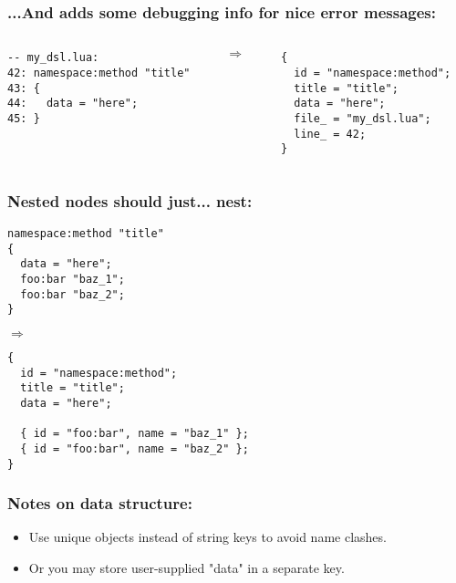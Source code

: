 \documentclass[handout]{beamer}
\begin{document}
\begin{frame}[fragile]

\frametitle{...And adds some debugging info for nice error messages:}

\begin{columns}

\begin{column}{0.5\textwidth}
\begin{verbatim}
-- my_dsl.lua:
42: namespace:method "title"
43: {
44:   data = "here";
45: }
\end{verbatim}
\end{column}

\begin{column}{0.05\textwidth}
$\Rightarrow$
\end{column}

\begin{column}{0.5\textwidth}
\begin{verbatim}
{
  id = "namespace:method";
  title = "title";
  data = "here";
  file_ = "my_dsl.lua";
  line_ = 42;
}
\end{verbatim}
\end{column}

\end{columns}

\end{frame}


\begin{frame}[fragile]

\frametitle{Nested nodes should just... nest:}

\begin{verbatim}
namespace:method "title"
{
  data = "here";
  foo:bar "baz_1";
  foo:bar "baz_2";
}
\end{verbatim}

$\Rightarrow$

\begin{verbatim}
{
  id = "namespace:method";
  title = "title";
  data = "here";

  { id = "foo:bar", name = "baz_1" };
  { id = "foo:bar", name = "baz_2" };
}
\end{verbatim}

\end{frame}


\begin{frame}[fragile]

\frametitle{Notes on data structure:}

\begin{itemize}
\item Use unique objects instead of string keys to avoid name clashes.
\item Or you may store user-supplied "data" in a separate key.
\end{itemize}

\end{frame}
\end{document}
